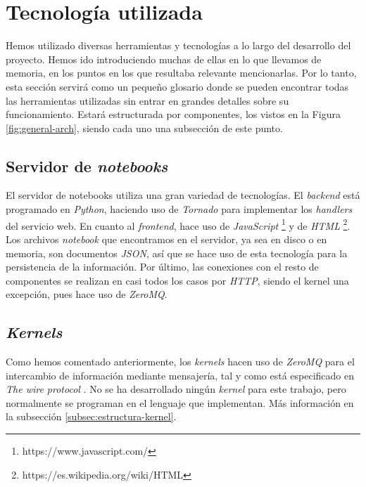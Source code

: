\documentclass[11pt,spanish,listoffigures]{tfgetsinf}
\begin{document}

\section{Tecnología utilizada}
\label{sec:tecno-utilizada}

Hemos utilizado diversas herramientas y tecnologías a lo largo del desarrollo del proyecto. Hemos ido introduciendo muchas de ellas en lo que llevamos de memoria, en los puntos en los que resultaba relevante mencionarlas. Por lo tanto, esta sección servirá como un pequeño glosario donde se pueden encontrar todas las herramientas utilizadas sin entrar en grandes detalles sobre su funcionamiento. Estará estructurada por componentes, los vistos en la Figura \ref{fig:general-arch}, siendo cada uno una subsección de este punto.


\subsection{Servidor de \textit{notebooks}}
\label{subsec:tecno-server}

El servidor de notebooks utiliza una gran variedad de tecnologías. El \textit{backend} está programado en \textit{Python}, haciendo uso de \textit{Tornado} para implementar los \textit{handlers} del servicio web. En cuanto al \textit{frontend}, hace uso de \textit{JavaScript} \footnote{https://www.javascript.com/} y de \textit{HTML} \footnote{https://es.wikipedia.org/wiki/HTML}. Los archivos \textit{notebook} que encontramos en el servidor, ya sea en disco o en memoria, son documentos \textit{JSON}, así que se hace uso de esta tecnología para la persistencia de la información. Por último, las conexiones con el resto de componentes se realizan en casi todos los casos por \textit{HTTP}, siendo el kernel una excepción, pues hace uso de \textit{ZeroMQ}. 


\subsection{\textit{Kernels}}
\label{subsec:tecno-kernels}

Como hemos comentado anteriormente, los \textit{kernels} hacen uso de \textit{ZeroMQ} para el intercambio de información mediante mensajería, tal y como está especificado en \textit{The wire protocol} \cite{wire-protocol}. No se ha desarrollado ningún \textit{kernel} para este trabajo, pero normalmente se programan en el lenguaje que implementan. Más información en la subsección \ref{subsec:estructura-kernel}.
\end{document}

